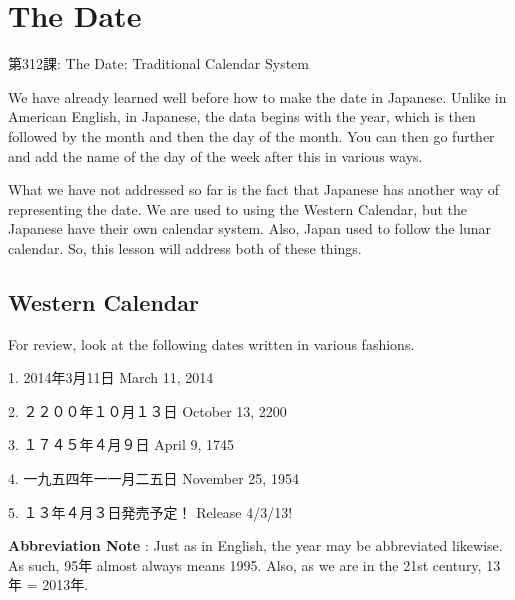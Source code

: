     
\chapter{The Date}

\begin{center}
\begin{Large}
第312課: The Date: Traditional Calendar System 
\end{Large}
\end{center}
 
\par{ We have already learned well before how to make the date in Japanese. Unlike in American English, in Japanese, the data begins with the year, which is then followed by the month and then the day of the month. You can then go further and add the name of the day of the week after this in various ways. }

\par{ What we have not addressed so far is the fact that Japanese has another way of representing the date. We are used to using the Western Calendar, but the Japanese have their own calendar system. Also, Japan used to follow the lunar calendar. So, this lesson will address both of these things. }
      
\section{Western Calendar}
 
\par{ For review, look at the following dates written in various fashions. }

\par{1. 2014年3月11日 \hfill\break
March 11, 2014 }

\par{2. ２２００年１０月１３日 \hfill\break
October 13, 2200 }

\par{3. １７４５年４月９日 \hfill\break
April 9, 1745 }

\par{4. 一九五四年一一月二五日 \hfill\break
November 25, 1954 }

\par{5. １３年４月３日発売予定！ \hfill\break
Release 4\slash 3\slash 13! }

\par{\textbf{Abbreviation Note }: Just as in English, the year may be abbreviated likewise. As such, 95年 almost always means 1995. Also, as we are in the 21st century, 13年 = 2013年. }

